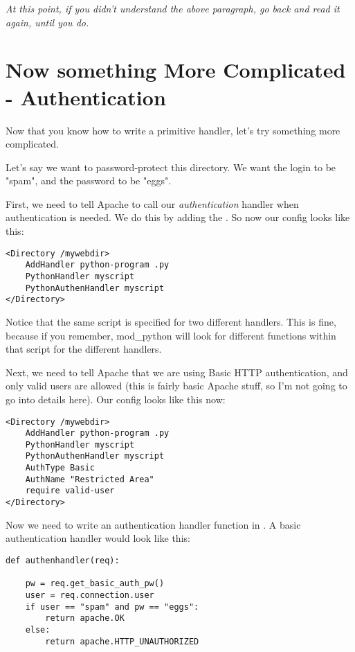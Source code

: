  \emph{At this point, if you didn't understand the above paragraph, go back and read it again, until you do.}

\section{Now something More Complicated - Authentication\label{tut-more-complicated}}

Now that you know how to write a primitive handler, let's try
something more complicated.

Let's say we want to password-protect this directory. We want the
login to be "spam", and the password to be "eggs".

First, we need to tell Apache to call our \emph{authentication} handler when
authentication is needed. We do this by adding the
. So now our config looks like this:

\begin{verbatim}
<Directory /mywebdir>
    AddHandler python-program .py
    PythonHandler myscript
    PythonAuthenHandler myscript
</Directory>
\end{verbatim}

Notice that the same script is specified for two different
handlers. This is fine, because if you remember, mod_python will look
for different functions within that script for the different handlers.

Next, we need to tell Apache that we are using Basic HTTP
authentication, and only valid users are allowed (this is fairly basic
Apache stuff, so I'm not going to go into details here). Our config
looks like this now:

\begin{verbatim}
<Directory /mywebdir>
    AddHandler python-program .py
    PythonHandler myscript
    PythonAuthenHandler myscript
    AuthType Basic
    AuthName "Restricted Area"
    require valid-user
</Directory>
\end{verbatim}          

Now we need to write an authentication handler function in
. A basic authentication handler would look like this:

\begin{verbatim}
def authenhandler(req):

    pw = req.get_basic_auth_pw()
    user = req.connection.user     
    if user == "spam" and pw == "eggs":
        return apache.OK
    else:
        return apache.HTTP_UNAUTHORIZED
\end{verbatim}  

